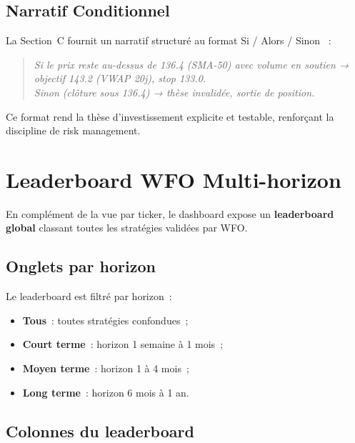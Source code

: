 \subsection{Narratif Conditionnel}

La Section~C fournit un narratif structuré au format \og Si / Alors / Sinon \fg{}~:

\begin{quote}
\textit{Si le prix reste au-dessus de 136.4 (SMA-50) avec volume en soutien →
objectif 143.2 (VWAP 20j), stop 133.0. \\
Sinon (clôture sous 136.4) → thèse invalidée, sortie de position.}
\end{quote}

Ce format rend la thèse d'investissement explicite et testable, renforçant la
discipline de risk management.

\section{Leaderboard WFO Multi-horizon}
\label{sec:leaderboard}

En complément de la vue par ticker, le dashboard expose un \textbf{leaderboard global}
classant toutes les stratégies validées par WFO.

\subsection{Onglets par horizon}

Le leaderboard est filtré par horizon~:
\begin{itemize}
    \item \textbf{Tous}~: toutes stratégies confondues~;
    \item \textbf{Court terme}~: horizon 1 semaine à 1 mois~;
    \item \textbf{Moyen terme}~: horizon 1 à 4 mois~;
    \item \textbf{Long terme}~: horizon 6 mois à 1 an.
\end{itemize}

\subsection{Colonnes du leaderboard}

